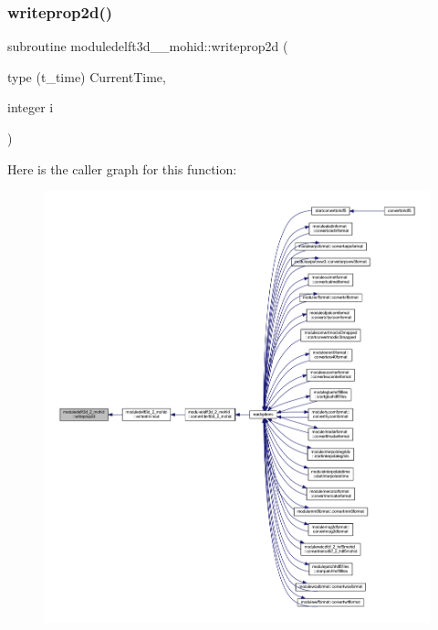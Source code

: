 \mbox{\label{namespacemoduledelft3d__2__mohid_a21830963ef76515bef7bb6ae8f5fb77b}} 
\subsubsection{\texorpdfstring{writeprop2d()}{writeprop2d()}}
{\footnotesize\ttfamily subroutine moduledelft3d\+\_\+\_\+mohid\+::writeprop2d (\begin{DoxyParamCaption}\item[{type (t\+\_\+time)}]{Current\+Time,  }\item[{integer}]{i }\end{DoxyParamCaption})\hspace{0.3cm}{\ttfamily [private]}}

Here is the caller graph for this function\+:\nopagebreak
\begin{figure}[H]
\begin{center}
\leavevmode
\includegraphics[width=350pt]{namespacemoduledelft3d__2__mohid_a21830963ef76515bef7bb6ae8f5fb77b_icgraph}
\end{center}
\end{figure}


